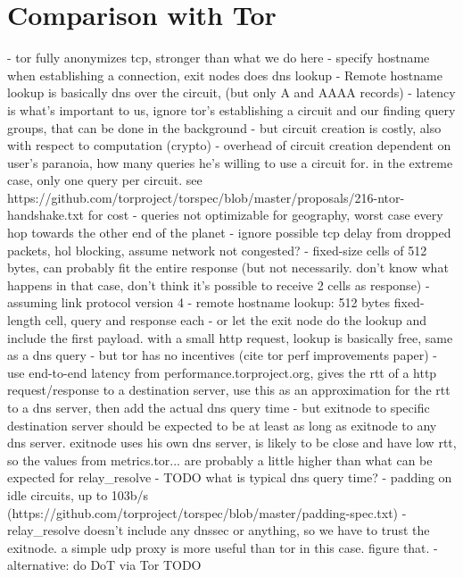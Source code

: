 \section{Comparison with Tor}
- tor fully anonymizes tcp, stronger than what we do here
    - specify hostname when establishing a connection, exit nodes does dns
      lookup
    - Remote hostname lookup is basically dns over the circuit, (but only A and
      AAAA records)
- latency is what's important to us, ignore tor's establishing a circuit and our
  finding query groups, that can be done in the background
- but circuit creation is costly, also with respect to computation (crypto)
- overhead of circuit creation dependent on user's paranoia, how many queries
  he's willing to use a circuit for. in the extreme case, only one query per
  circuit. see
  https://github.com/torproject/torspec/blob/master/proposals/216-ntor-handshake.txt
  for cost
- queries not optimizable for geography, worst case every hop towards the other
  end of the planet
- ignore possible tcp delay from dropped packets, hol blocking, assume network
  not congested?
- fixed-size cells of 512 bytes, can probably fit the entire response (but not
  necessarily. don't know what happens in that case, don't think it's possible
  to receive 2 cells as response)
- assuming link protocol version 4
- remote hostname lookup: 512 bytes fixed-length cell, query and response each
- or let the exit node do the lookup and include the first payload. with a small
  http request, lookup is basically free, same as a dns query
- but tor has no incentives (cite tor perf improvements paper)
- use end-to-end latency from performance.torproject.org, gives the rtt of a
  http request/response to a destination server, use this as an approximation
  for the rtt to a dns server, then add the actual dns query time
    - but exitnode to specific destination server should be expected to be at
      least as long as exitnode to any dns server. exitnode uses his own dns
      server, is likely to be close and have low rtt, so the values from
      metrics.tor... are probably a little higher than what can be expected for
      relay\_resolve
- TODO what is typical dns query time?
- %
  padding on idle circuits, up to 103b/s
  (https://github.com/torproject/torspec/blob/master/padding-spec.txt)
- relay\_resolve doesn't include any dnssec or anything, so we have to trust the
  exitnode. a simple udp proxy is more useful than tor in this case. figure
  that.
    - alternative: do DoT via Tor
TODO
